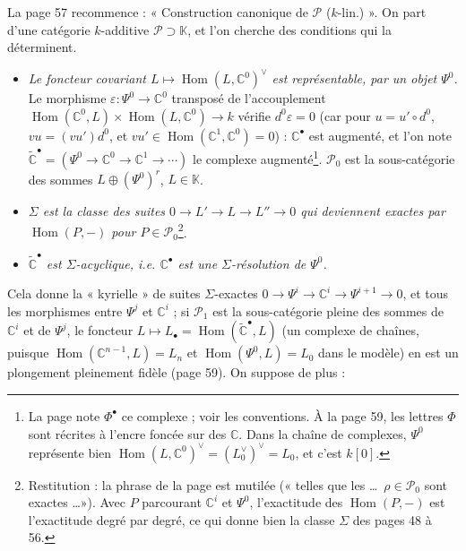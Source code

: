 \documentclass[11pt,a4paper]{article}
\begin{document}
La page 57 recommence : « Construction canonique de $\mathcal{P}$
($k$-lin.) ». On part d'une catégorie $k$-additive $\mathcal{P} \supset
\mathbb{K}$, et l'on cherche des conditions qui la déterminent.
\begin{itemize}
\item[a)] \emph{Le foncteur covariant $L \mapsto \operatorname{Hom}(L,
\mathbb{C}^{0})^{\vee}$ est représentable, par un objet $\Psi^{0}$.} Le
morphisme $\varepsilon : \Psi^{0} \to \mathbb{C}^{0}$ transposé de
l'accouplement $\operatorname{Hom}(\mathbb{C}^{0}, L) \times
\operatorname{Hom}(L, \mathbb{C}^{0}) \to k$ vérifie $d^{0}\varepsilon = 0$
(car pour $u = u' \circ d^{0}$, $vu = (vu')d^{0}$, et $vu' \in
\operatorname{Hom}(\mathbb{C}^{1}, \mathbb{C}^{0}) = 0$) : $\mathbb{C}^{\bullet}$
est augmenté, et l'on note $\widetilde{\mathbb{C}}^{\bullet} = (\Psi^{0} \to
\mathbb{C}^{0} \to \mathbb{C}^{1} \to \cdots)$ le complexe augmenté\footnote{La
page note $\Phi^{\bullet}$ ce complexe ; voir les conventions. À la page 59,
les lettres $\Phi$ sont récrites à l'encre foncée sur des $\mathbb{C}$. Dans
la chaîne de complexes, $\Psi^{0}$ représente bien
$\operatorname{Hom}(L, \mathbb{C}^{0})^{\vee} = (L_{0}^{\vee})^{\vee} =
L_{0}$, et c'est $k[0]$.}. $\mathcal{P}_{0}$ est la sous-catégorie des
sommes $L \oplus (\Psi^{0})^{r}$, $L \in \mathbb{K}$.
\item[b)] \emph{$\Sigma$ est la classe des suites $0 \to L' \to L \to L''
\to 0$ qui deviennent exactes par $\operatorname{Hom}(P, -)$ pour $P \in
\mathcal{P}_{0}$}\footnote{Restitution : la phrase de la page est mutilée
(« telles que les \ldots\ $\rho \in \mathcal{P}_{0}$ sont exactes \ldots »).
Avec $P$ parcourant $\mathbb{C}^{i}$ et $\Psi^{0}$, l'exactitude des
$\operatorname{Hom}(P, -)$ est l'exactitude degré par degré, ce qui donne
bien la classe $\Sigma$ des pages 48 à 56.}.
\item[c)] \emph{$\widetilde{\mathbb{C}}^{\bullet}$ est $\Sigma$-acyclique,
i.e. $\mathbb{C}^{\bullet}$ est une $\Sigma$-résolution de $\Psi^{0}$.}
\end{itemize}
Cela donne la « kyrielle » de suites $\Sigma$-exactes $0 \to \Psi^{i} \to
\mathbb{C}^{i} \to \Psi^{i+1} \to 0$, et tous les morphismes entre $\Psi^{j}$
et $\mathbb{C}^{i}$ ; si $\mathcal{P}_{1}$ est la sous-catégorie pleine des
sommes de $\mathbb{C}^{i}$ et de $\Psi^{j}$, le foncteur $L \mapsto
L_{\bullet} = \operatorname{Hom}(\widetilde{\mathbb{C}}^{\bullet}, L)$ (un
complexe de chaînes, puisque $\operatorname{Hom}(\mathbb{C}^{n-1}, L) = L_{n}$
et $\operatorname{Hom}(\Psi^{0}, L) = L_{0}$ dans le modèle) en est un plongement pleinement fidèle (page 59). On suppose de plus :
\end{document}
